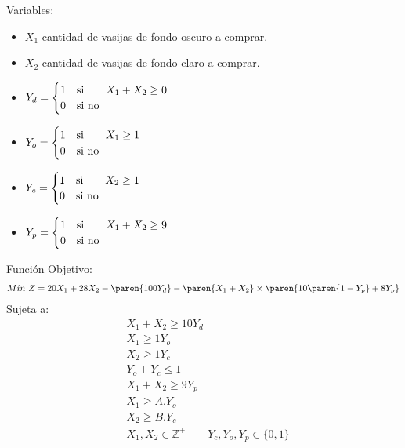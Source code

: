 

\begin{homeworkProblem}[-1][Sophilios]
Variables:
\begin{itemize}
    \item $X_1$ cantidad de vasijas de fondo oscuro a comprar.
    \item $X_2$ cantidad de vasijas de fondo claro a comprar.
    \item $
    Y_d =
    \begin{cases}
        1   &\mbox{\text{si}}\quad\quad X_1+X_2\ge 0 \\
        0   &\mbox{\text{si no }}\quad
    \end{cases}
    $
    \item $
    Y_o =
    \begin{cases}
        1   &\mbox{\text{si}}\quad\quad X_1 \ge 1 \\
        0   &\mbox{\text{si no }}\quad
    \end{cases}
    $
    \item $
    Y_c =
    \begin{cases}
        1   &\mbox{\text{si}}\quad\quad X_2 \ge 1 \\
        0   &\mbox{\text{si no }}\quad
    \end{cases}
    $
    \item $
    Y_p =
    \begin{cases}
        1   &\mbox{\text{si}}\quad\quad X_1+X_2\ge 9 \\
        0   &\mbox{\text{si no }}\quad
    \end{cases}
    $
    
\end{itemize}

Función Objetivo:
\begin{align*}
    Min\ Z = 20X_1 + 28X_2 - \paren{100Y_d} - \paren{X_1+X_2}\times\paren{10\paren{1-Y_p}+8Y_p}
\end{align*}
Sujeta a:
\begin{align*}
    &X_1+X_2\geq 10Y_d\\
    &X_1 \geq 1Y_o\\
    &X_2 \geq 1Y_c\\
    &Y_o + Y_c \leq 1 \\
    &X_1+X_2 \geq 9Y_p \\
    &X_1\geq A.Y_o \\
    &X_2\geq B.Y_c \\
    &X_1,X_2\in \mathbb{Z}^+\quad\quad Y_c,Y_o,Y_p \in \{0,1\}
\end{align*}
\end{homeworkProblem}


